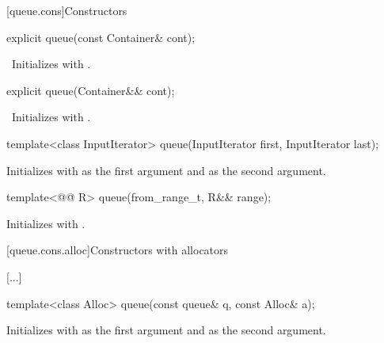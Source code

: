 \documentclass{wg21}
\begin{document}
[queue.cons]{Constructors}

\begin{itemdecl}
    explicit queue(const Container& cont);
\end{itemdecl}

\begin{itemdescr}
    \pnum
    \effects\ Initializes  with .
\end{itemdescr}

\begin{itemdecl}
    explicit queue(Container&& cont);
\end{itemdecl}

\begin{itemdescr}
    \pnum
    \effects\ Initializes  with .
\end{itemdescr}

\begin{itemdecl}
    template<class InputIterator>
    queue(InputIterator first, InputIterator last);
\end{itemdecl}

\begin{itemdescr}
    \pnum
    \effects
    Initializes  with  as the first argument and  as the second argument.
\end{itemdescr}

\begin{addedblock}
\begin{itemdecl}
    template<@@ R>
    queue(from_range_t, R&& range);
\end{itemdecl}

\begin{itemdescr}
    \pnum
    \effects
    Initializes  with .
\end{itemdescr}
\end{addedblock}

[queue.cons.alloc]{Constructors with allocators}

[...]

\begin{itemdecl}
    template<class Alloc> queue(const queue& q, const Alloc& a);
\end{itemdecl}

\begin{itemdescr}
    \pnum
    \effects
    Initializes  with  as the first argument and  as the
    second argument.
\end{itemdescr}
\end{document}
